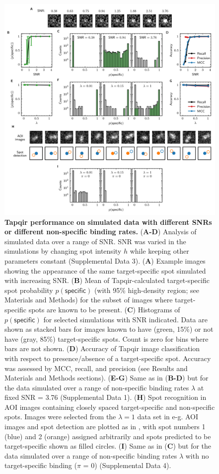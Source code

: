 \begin{figure}
\begin{fullwidth}
\includegraphics[width=183mm]{figures/tapqir_performance.png}
\caption{\textbf{Tapqir performance on simulated data with different SNRs or different non-specific binding rates.} (\textbf{A-D}) Analysis of simulated data over a range of SNR. SNR was varied in the simulations by changing spot intensity  $h$ while keeping other parameters constant (Supplemental Data 3). (\textbf{A}) Example images showing the appearance of the same target-specific spot simulated with increasing SNR.   (\textbf{B}) Mean of Tapqir-calculated target-specific spot probability $p(\mathsf{specific})$ (with 95\% high-density region; see Materials and Methods) for the subset of images where target-specific spots  are known to be present. (\textbf{C}) Histograms of $p(\mathsf{specific})$ for selected simulations with SNR indicated. Data are shown as stacked bars for images known to have (green, 15\%) or not have (gray, 85\%) target-specific spots.  Count is zero for bins where bars are not shown. (\textbf{D}) Accuracy of Tapqir image classification with respect to presence/absence of a target-specific spot. Accuracy was assessed by MCC, recall, and precision (see Results and Materials and Methods sections). (\textbf{E-G}) Same as in (\textbf{B-D}) but for the data simulated over a range of non-specific binding rates $\lambda$ at fixed SNR = 3.76 (Supplemental Data 1). (\textbf{H}) Spot recognition in AOI images containing closely spaced target-specific and non-specific spots.  Images were selected from the $\lambda = 1$ data set in e-g. AOI images and spot detection are plotted as in , with spot numbers 1 (blue) and 2 (orange) assigned arbitrarily and spots predicted to be target-specific shown as filled circles. (\textbf{I}) Same as in (\textbf{C}) but for the data simulated over a range of non-specific binding rates $\lambda$ with no target-specific binding ($\pi$ = 0) (Supplemental Data 4).}

\end{fullwidth}
\end{figure}
